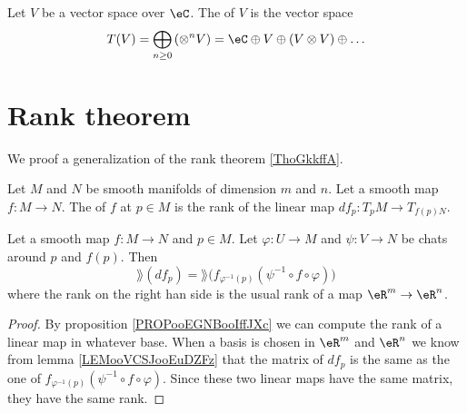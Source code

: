 \begin{definition}      \label{DEFooHPQXooETvEyn}
    Let \( V\) be a vector space over \( \eC\). The  of \( V\) is the vector space
    \begin{equation}
        T(V)=\bigoplus_{n\geq 0}\left(\otimes^nV\right)=\eC\oplus V\oplus(V\otimes V)\oplus\ldots
    \end{equation}
\end{definition}


\section{Rank theorem}

We proof a generalization of the rank theorem \ref{ThoGkkffA}.

\begin{definition}
    Let \( M\) and \( N\) be smooth manifolds of dimension \( m\) and \( n\). Let a smooth map \( f\colon M\to N\). The  of \( f\) at \( p\in M\) is the rank of the linear map \( df_p\colon T_pM\to T_{f(p)N}\).
\end{definition}

\begin{lemma}
    Let a smooth map \( f\colon M\to N\) and \( p\in M\). Let \( \varphi\colon U\to M\) and \( \psi\colon V\to N\) be chats around \( p\) and \( f(p)\). Then
    \begin{equation}
        \rang(df_p)=\rang\big( f_{\varphi^{-1}(p)}(\psi^{-1}\circ f\circ \varphi) \big)
    \end{equation}
    where the rank on the right han side is the usual rank of a map \( \eR^m\to \eR^n\).
\end{lemma}

\begin{proof}
    By proposition \ref{PROPooEGNBooIffJXc} we can compute the rank of a linear map in whatever base. When a basis is chosen in \( \eR^m\) and \( \eR^n\) we know from lemma \ref{LEMooVCSJooEuDZFz} that the matrix of \( df_p\) is the same as the one of \(  f_{\varphi^{-1}(p)}(\psi^{-1}\circ f\circ \varphi) \). Since these two linear maps have the same matrix, they have the same rank.
\end{proof}

